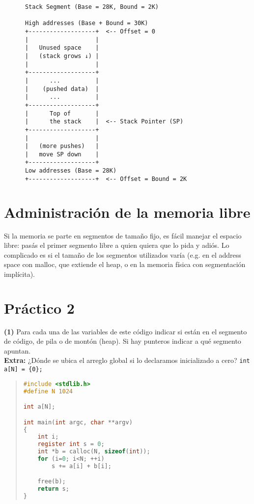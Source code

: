 \documentclass[12pt]{article}
\theoremstyle{definition}
\begin{document}
\begin{verbatim}
      Stack Segment (Base = 28K, Bound = 2K)

      High addresses (Base + Bound = 30K)
      +-------------------+  <-- Offset = 0
      |                   |  
      |   Unused space    |
      |   (stack grows ↓) |
      |                   |
      +-------------------+
      |      ...          |
      |    (pushed data)  |
      |      ...          |
      +-------------------+
      |      Top of       |
      |      the stack    |  <-- Stack Pointer (SP)
      +-------------------+
      |                   |
      |   (more pushes)   |
      |   move SP down    |
      +-------------------+
      Low addresses (Base = 28K)
      +-------------------+  <-- Offset = Bound = 2K
\end{verbatim}

\pagebreak 

\section{Administración de la memoria libre}

Si la memoria se parte en segmentos de tamaño fijo, es fácil manejar el espacio
libre: pasás el primer segmento libre a quien quiera que lo pida y adiós. Lo
complicado es si el tamaño de los segmentos utilizados varía (e.g. en el address
space con malloc, que extiende el heap, o en la memoria física con segmentación
implícita).

\pagebreak 

\section{Práctico 2}


\begin{shaded}
\textbf{(1)} Para cada una de las variables de este código indicar si están en el segmento de código, de pila o de montón (heap). 
Si hay punteros indicar a qué segmento apuntan. \\

\textbf{Extra:} ¿Dónde se ubica el arreglo global si lo declaramos inicializado a cero? 
\verb|int a[N] = {0};|

\small
\begin{quote}


\begin{lstlisting}[language=C]
#include <stdlib.h>
#define N 1024

int a[N];

int main(int argc, char **argv)
{
    int i;
    register int s = 0;
    int *b = calloc(N, sizeof(int));
    for (i=0; i<N; ++i)
        s += a[i] + b[i];

    free(b);
    return s;
}
\end{lstlisting}

\end{quote}
\normalsize
\end{shaded}
\end{document}
